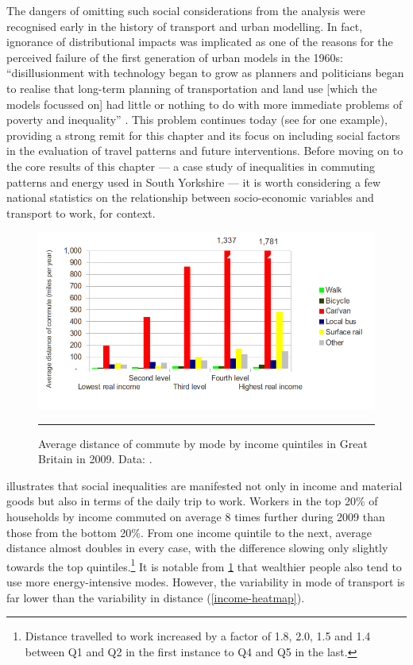 The dangers of omitting such social considerations from the analysis were
recognised early in the history of transport and urban modelling. In fact,
ignorance of distributional impacts was implicated as
one of the reasons for the perceived failure of the first generation of urban
models in the 1960s: ``disillusionment with technology began to grow as
planners and politicians began to realise that long-term planning of
transportation and land use [which the models focussed on] had little or nothing
to do with more immediate problems of poverty and inequality''
\citep[p~10]{batty1976urban}. This problem continues today (see
\citealp{Tribby2012} for one example), providing a strong remit for this
chapter and its focus on including social factors in the evaluation of travel
patterns and future interventions. Before moving on to the core results of this
chapter --- a case study of inequalities in commuting patterns and energy used
in South Yorkshire --- it is worth considering a few national statistics on
the relationship between socio-economic variables and transport to work, for
context.

\begin{figure}[htbp]
  \centerline{
    \includegraphics[width = 14 cm]{./Figures/Income-dis-GB}}
    \rule{35em}{0.5pt}
  \caption[Trip distance and mode by household income]{Average
distance of commute by mode by income quintiles in Great Britain
in 2009. Data: \citep[Table 6]{DfT2011-commuting}.}
  \label{fig:income-dis}
\end{figure}

 illustrates that social inequalities are manifested
not only in income and material goods but also in terms of the
daily trip to work. Workers in the top 20\% of households by income
commuted on average 8 times further during 2009 than those from the
bottom 20\%. From one income quintile to the next, average distance
almost doubles in every case, with the difference slowing only slightly towards
the
top quintiles.\footnote{Distance
travelled to work increased by a
factor of 1.8, 2.0, 1.5 and 1.4 between Q1 and Q2 in the
first instance to Q4 and Q5 in the last.
}
It is notable from \cref{fig:income-dis} that wealthier people
also tend to use more energy-intensive modes. However,
the variability in mode of transport is far lower than the
variability in distance (\cref{income-heatmap}).


